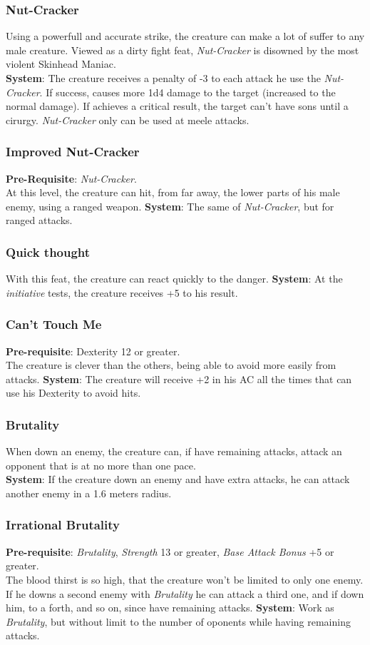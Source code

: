 \documentclass[ letterpaper,12pt]{article}
\begin{document}
\subsubsection{Nut-Cracker}
Using a powerfull and accurate strike, the creature can make a lot of suffer to any male creature. Viewed as a dirty fight feat, {\it Nut-Cracker} is disowned by the most violent Skinhead Maniac.\\
{\bf System}: The creature receives a penalty of -3 to each attack he use the {\it Nut-Cracker}. If success, causes more 1d4 damage to the target (increased to the normal damage). If achieves a critical result, the target can't have sons until a cirurgy. {\it Nut-Cracker} only can be used at meele attacks.

\subsubsection{Improved Nut-Cracker}
{\bf Pre-Requisite}: {\it Nut-Cracker}.\\
At this level, the creature can hit, from far away, the lower parts of his male enemy, using a ranged weapon.
{\bf System}: The same of {\it Nut-Cracker}, but for ranged attacks.

\subsubsection{Quick thought}
With this feat, the creature can react quickly to the danger.
{\bf System}: At the {\it initiative} tests, the creature receives +5 to his result.

\subsubsection{Can't Touch Me}
{\bf Pre-requisite}: Dexterity 12 or greater.\\
The creature is clever than the others, being able to avoid more easily from attacks.
{\bf System}: The creature will receive +2 in his AC all the times that can use his Dexterity to avoid hits.

\subsubsection{Brutality}
When down an enemy, the creature can, if have remaining attacks, attack an opponent that is at no more than one pace.\\
{\bf System}: If the creature down an enemy and have extra attacks, he can attack another enemy in a 1.6 meters radius.

\subsubsection{Irrational Brutality}
{\bf Pre-requisite}: {\it Brutality}, {\it Strength} 13 or greater, {\it Base Attack Bonus} +5 or greater.\\
The blood thirst is so high, that the creature won't be limited to only one enemy. If he downs a second enemy with {\it Brutality} he can attack a third one, and if down him, to a forth, and so on, since have remaining attacks.
{\bf System}: Work as {\it Brutality}, but without limit to the number of oponents while having remaining attacks.
\end{document}
